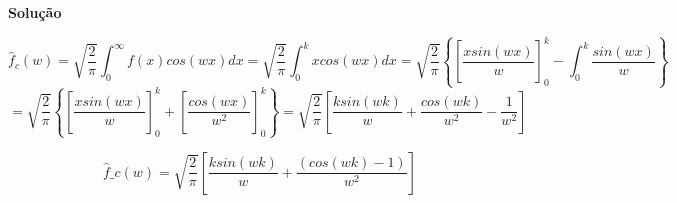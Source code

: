 \linespread{1.5}

\textbf{Solução}

\begin{equation*}
    \hat{f}_c(w) = \sqrt{\frac{2}{\pi}}\int_0^\infty f(x)cos(wx)dx = \sqrt{\frac{2}{\pi}}\int_0^k xcos(wx)dx = \sqrt{\frac{2}{\pi}}\left\{\left[\frac{xsin(wx)}{w}\right]^k_0 - \int_0^k\frac{sin(wx)}{w}\right\}
\end{equation*}
\begin{equation}
   =  \sqrt{\frac{2}{\pi}}\left\{\left[\frac{xsin(wx)}{w}\right]^k_0 + \left[\frac{cos(wx)}{w^2}\right]_0^k\right\} = \sqrt{\frac{2}{\pi}}\left[\frac{ksin(wk)}{w} + \frac{cos(wk)}{w^2} - \frac{1}{w^2}\right]
\end{equation}

\begin{equation*}
    \boxed{ \hat{f}\_c(w) = \sqrt{\frac{2}{\pi}}\left[\frac{ksin(wk)}{w} + \frac{(cos(wk)-1)}{w^2}\right] }
\end{equation*}